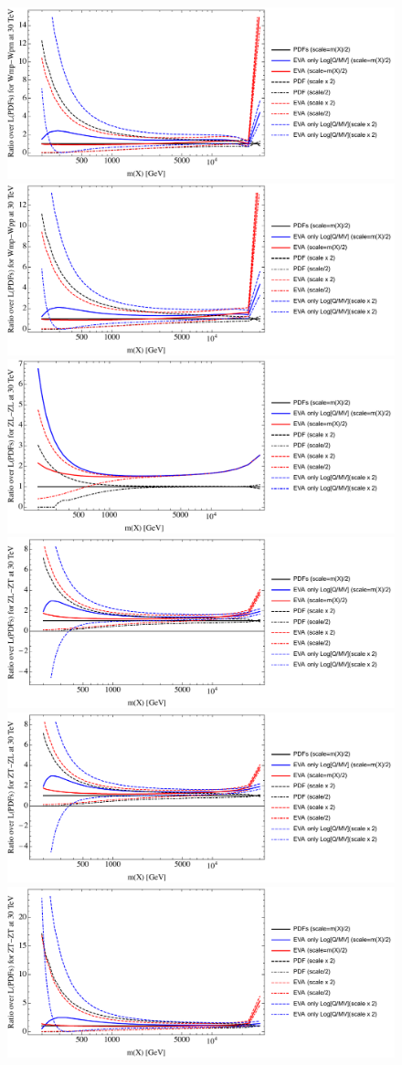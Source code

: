 \documentclass[a4paper,11pt]{article}
\begin{document}
\begin{figure}[ht]
\includegraphics[width=0.4\linewidth]{PlotLumi/30TeV/ratios/Wmp-Wpm.pdf}
\includegraphics[width=0.4\linewidth]{PlotLumi/30TeV/ratios/Wmp-Wpp.pdf}
\includegraphics[width=0.4\linewidth]{PlotLumi/30TeV/ratios/ZL-ZL.pdf}
\includegraphics[width=0.4\linewidth]{PlotLumi/30TeV/ratios/ZL-ZT.pdf}
\includegraphics[width=0.4\linewidth]{PlotLumi/30TeV/ratios/ZT-ZL.pdf}
\includegraphics[width=0.4\linewidth]{PlotLumi/30TeV/ratios/ZT-ZT.pdf}
\end{figure}
\end{document}

